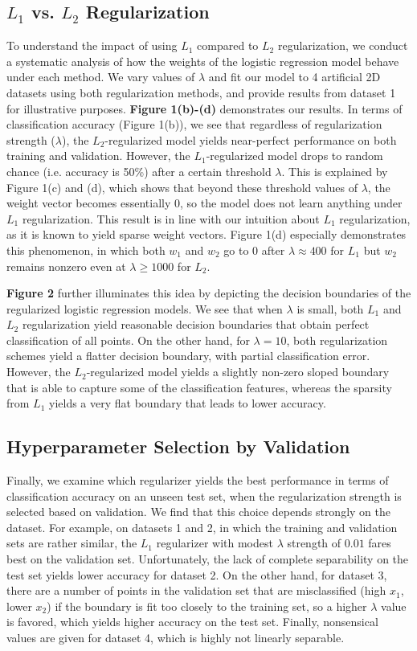 \documentclass[10pt,psamsfonts]{amsart}
\theoremstyle{definition}
\theoremstyle{remark}
\numberwithin{equation}{section}
\begin{document}
\subsection{$L_1$ vs. $L_2$ Regularization}To understand the impact of using $L_1$ compared to $L_2$ regularization, we conduct a systematic analysis of how the weights of the logistic regression model behave under each method. We vary values of $\lambda$ and fit our model to 4 artificial 2D datasets using both regularization methods, and provide results from dataset 1 for illustrative purposes. {\bf Figure 1(b)-(d)} demonstrates our results. In terms of classification accuracy (Figure 1(b)), we see that regardless of regularization strength ($\lambda$), the $L_2$-regularized model yields near-perfect performance on both training and validation. However, the $L_1$-regularized model drops to random chance (i.e. accuracy is 50\%) after a certain threshold $\lambda$. This is explained by Figure 1(c) and (d), which shows that beyond these threshold values of $\lambda$, the weight vector becomes essentially 0, so the model does not learn anything under $L_1$ regularization. This result is in line with our intuition about $L_1$ regularization, as it is known to yield sparse weight vectors. Figure 1(d) especially demonstrates this phenomenon, in which both $w_1$ and $w_2$ go to 0 after $\lambda \approx 400$ for $L_1$ but $w_2$ remains nonzero even at $\lambda \geq 1000$ for $L_2$.

{\bf Figure 2} further illuminates this idea by depicting the decision boundaries of the regularized logistic regression models. We see that when $\lambda$ is small, both $L_1$ and $L_2$ regularization yield reasonable decision boundaries that obtain perfect classification of all points. On the other hand, for $\lambda =10$, both regularization schemes yield a flatter decision boundary, with partial classification error. However, the $L_2$-regularized model yields a slightly non-zero sloped boundary that is able to capture some of the classification features, whereas the sparsity from $L_1$ yields a very flat boundary that leads to lower accuracy.

\subsection{Hyperparameter Selection by Validation} Finally, we examine which regularizer yields the best performance in terms of classification accuracy on an unseen test set, when the regularization strength is selected based on validation. We find that this choice depends strongly on the dataset. For example, on datasets 1 and 2, in which the training and validation sets are rather similar, the $L_1$ regularizer with modest $\lambda$ strength of $0.01$ fares best on the validation set. Unfortunately, the lack of complete separability on the test set yields lower accuracy for dataset 2. On the other hand, for dataset 3, there are a number of points in the validation set that are misclassified (high $x_1$, lower $x_2$) if the boundary is fit too closely to the training set, so a higher $\lambda$ value is favored, which yields higher accuracy on the test set. Finally, nonsensical values are given for dataset 4, which is highly not linearly separable.
\end{document}

